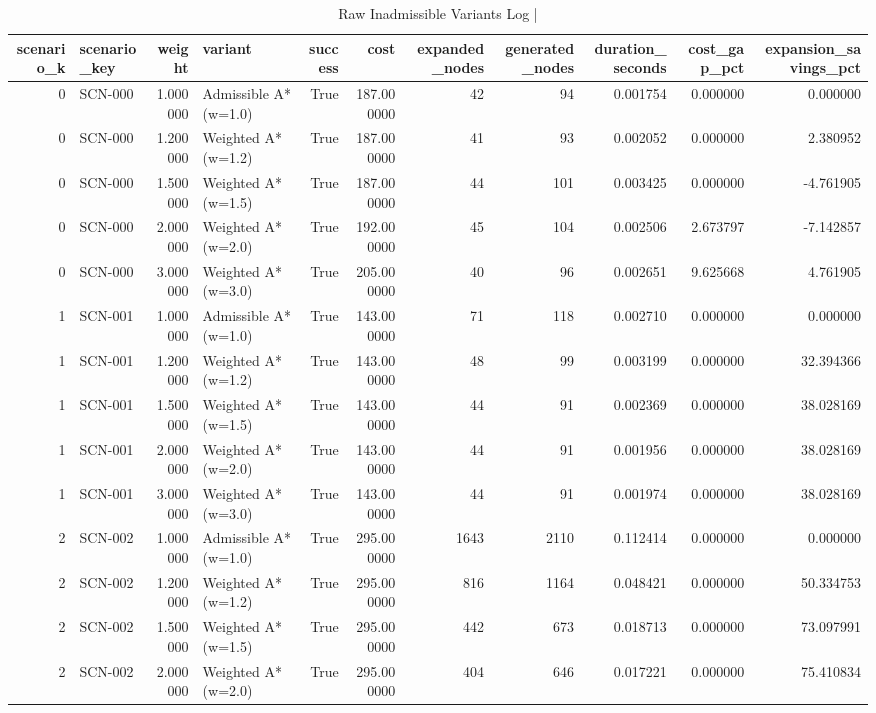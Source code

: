 \begin{table}[htbp]
\centering
\caption{Raw Inadmissible Variants Log | \stampline}
\label{tab:partB_inadmissible_raw}
\begin{tabular}{rlrlrrrrrrr}
\toprule
scenario\_k & scenario\_key & weight & variant & success & cost & expanded\_nodes & generated\_nodes & duration\_seconds & cost\_gap\_pct & expansion\_savings\_pct \\
\midrule
0 & SCN-000 & 1.000000 & Admissible A* (w=1.0) & True & 187.000000 & 42 & 94 & 0.001754 & 0.000000 & 0.000000 \\
0 & SCN-000 & 1.200000 & Weighted A* (w=1.2) & True & 187.000000 & 41 & 93 & 0.002052 & 0.000000 & 2.380952 \\
0 & SCN-000 & 1.500000 & Weighted A* (w=1.5) & True & 187.000000 & 44 & 101 & 0.003425 & 0.000000 & -4.761905 \\
0 & SCN-000 & 2.000000 & Weighted A* (w=2.0) & True & 192.000000 & 45 & 104 & 0.002506 & 2.673797 & -7.142857 \\
0 & SCN-000 & 3.000000 & Weighted A* (w=3.0) & True & 205.000000 & 40 & 96 & 0.002651 & 9.625668 & 4.761905 \\
1 & SCN-001 & 1.000000 & Admissible A* (w=1.0) & True & 143.000000 & 71 & 118 & 0.002710 & 0.000000 & 0.000000 \\
1 & SCN-001 & 1.200000 & Weighted A* (w=1.2) & True & 143.000000 & 48 & 99 & 0.003199 & 0.000000 & 32.394366 \\
1 & SCN-001 & 1.500000 & Weighted A* (w=1.5) & True & 143.000000 & 44 & 91 & 0.002369 & 0.000000 & 38.028169 \\
1 & SCN-001 & 2.000000 & Weighted A* (w=2.0) & True & 143.000000 & 44 & 91 & 0.001956 & 0.000000 & 38.028169 \\
1 & SCN-001 & 3.000000 & Weighted A* (w=3.0) & True & 143.000000 & 44 & 91 & 0.001974 & 0.000000 & 38.028169 \\
2 & SCN-002 & 1.000000 & Admissible A* (w=1.0) & True & 295.000000 & 1643 & 2110 & 0.112414 & 0.000000 & 0.000000 \\
2 & SCN-002 & 1.200000 & Weighted A* (w=1.2) & True & 295.000000 & 816 & 1164 & 0.048421 & 0.000000 & 50.334753 \\
2 & SCN-002 & 1.500000 & Weighted A* (w=1.5) & True & 295.000000 & 442 & 673 & 0.018713 & 0.000000 & 73.097991 \\
2 & SCN-002 & 2.000000 & Weighted A* (w=2.0) & True & 295.000000 & 404 & 646 & 0.017221 & 0.000000 & 75.410834 \\

\end{tabular}
\end{table}
